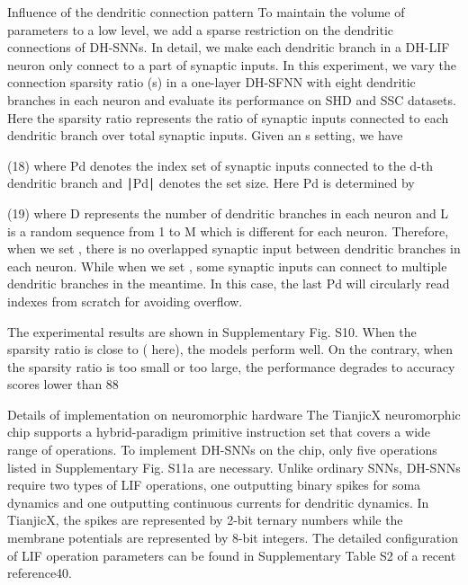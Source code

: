 Influence of the dendritic connection pattern
To maintain the volume of parameters to a low level, we add a sparse restriction on the dendritic connections of DH-SNNs. In detail, we make each dendritic branch in a DH-LIF neuron only connect to a part of synaptic inputs. In this experiment, we vary the connection sparsity ratio (s) in a one-layer DH-SFNN with eight dendritic branches in each neuron and evaluate its performance on SHD and SSC datasets. Here the sparsity ratio represents the ratio of synaptic inputs connected to each dendritic branch over total synaptic inputs. Given an s setting, we have

(18)
where Pd denotes the index set of synaptic inputs connected to the d-th dendritic branch and ∣Pd∣ denotes the set size. Here Pd is determined by

(19)
where D represents the number of dendritic branches in each neuron and L is a random sequence from 1 to M which is different for each neuron. Therefore, when we set 
, there is no overlapped synaptic input between dendritic branches in each neuron. While when we set 
, some synaptic inputs can connect to multiple dendritic branches in the meantime. In this case, the last Pd will circularly read indexes from scratch for avoiding overflow.

The experimental results are shown in Supplementary Fig. S10. When the sparsity ratio is close to 
 (
 here), the models perform well. On the contrary, when the sparsity ratio is too small or too large, the performance degrades to accuracy scores lower than 88%

Details of implementation on neuromorphic hardware
The TianjicX neuromorphic chip supports a hybrid-paradigm primitive instruction set that covers a wide range of operations. To implement DH-SNNs on the chip, only five operations listed in Supplementary Fig. S11a are necessary. Unlike ordinary SNNs, DH-SNNs require two types of LIF operations, one outputting binary spikes for soma dynamics and one outputting continuous currents for dendritic dynamics. In TianjicX, the spikes are represented by 2-bit ternary numbers while the membrane potentials are represented by 8-bit integers. The detailed configuration of LIF operation parameters can be found in Supplementary Table S2 of a recent reference40.

